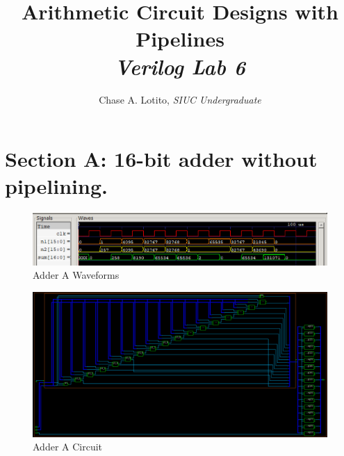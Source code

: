 \documentclass{article}
\title{\vspace{-3cm}Arithmetic Circuit Designs with Pipelines \\ {\normalsize \textit{Verilog Lab 6}}}
\author{Chase A. Lotito, \textit{SIUC Undergraduate}}
\date{}
\begin{document}
\pagestyle{fancy}

\fancyhead{}

\maketitle %

\section*{Section A: 16-bit adder without pipelining.}





\begin{figure}[!ht] 
    \centering
    \includegraphics*[width = 15.1cm]{adder_a.png}
    \caption{Adder A Waveforms}
    \label{fig:awaves}
\end{figure}    


\begin{figure}[!ht] 
    \centering
    \includegraphics*[width = 15.1cm]{adder_a_circuit.png}
    \caption{Adder A Circuit}
    \label{fig:acircuit}
\end{figure}    
\end{document}
